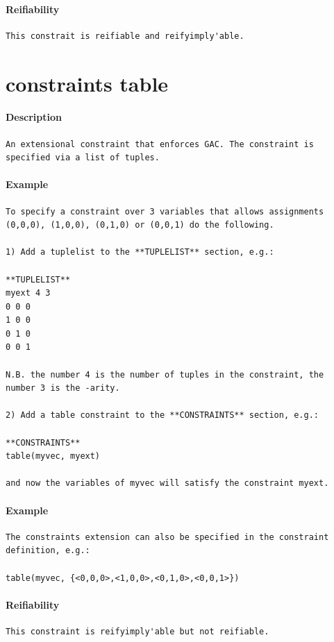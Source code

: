 \documentclass[oneside]{book}
\begin{document}
\paragraph{Reifiability}
{\footnotesize
\begin{verbatim}
This constrait is reifiable and reifyimply'able.
\end{verbatim}
}
\section{constraints table}
\paragraph{Description}
{\footnotesize
\begin{verbatim}
An extensional constraint that enforces GAC. The constraint is
specified via a list of tuples.
\end{verbatim}
}
\paragraph{Example}
{\footnotesize
\begin{verbatim}
To specify a constraint over 3 variables that allows assignments
(0,0,0), (1,0,0), (0,1,0) or (0,0,1) do the following.

1) Add a tuplelist to the **TUPLELIST** section, e.g.:

**TUPLELIST**
myext 4 3
0 0 0
1 0 0
0 1 0
0 0 1

N.B. the number 4 is the number of tuples in the constraint, the 
number 3 is the -arity.

2) Add a table constraint to the **CONSTRAINTS** section, e.g.:

**CONSTRAINTS**
table(myvec, myext)

and now the variables of myvec will satisfy the constraint myext.
\end{verbatim}
}
\paragraph{Example}
{\footnotesize
\begin{verbatim}
The constraints extension can also be specified in the constraint
definition, e.g.:

table(myvec, {<0,0,0>,<1,0,0>,<0,1,0>,<0,0,1>})
\end{verbatim}
}
\paragraph{Reifiability}
{\footnotesize
\begin{verbatim}
This constraint is reifyimply'able but not reifiable.
\end{verbatim}
}
\end{document}
